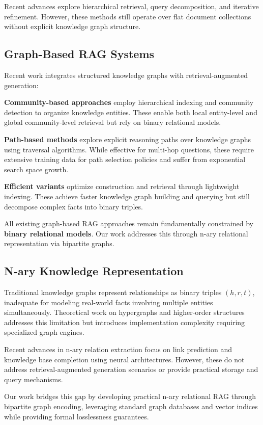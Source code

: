 \documentclass[11pt,a4paper]{article}
\begin{document}
Recent advances explore hierarchical retrieval, query decomposition, and iterative refinement. However, these methods still operate over flat document collections without explicit knowledge graph structure.

\subsection{Graph-Based RAG Systems}

Recent work integrates structured knowledge graphs with retrieval-augmented generation:

\textbf{Community-based approaches} employ hierarchical indexing and community detection to organize knowledge entities. These enable both local entity-level and global community-level retrieval but rely on binary relational models.

\textbf{Path-based methods} explore explicit reasoning paths over knowledge graphs using traversal algorithms. While effective for multi-hop questions, these require extensive training data for path selection policies and suffer from exponential search space growth.

\textbf{Efficient variants} optimize construction and retrieval through lightweight indexing. These achieve faster knowledge graph building and querying but still decompose complex facts into binary triples.

All existing graph-based RAG approaches remain fundamentally constrained by \textbf{binary relational models}. Our work addresses this through n-ary relational representation via bipartite graphs.

\subsection{N-ary Knowledge Representation}

Traditional knowledge graphs represent relationships as binary triples $(h, r, t)$, inadequate for modeling real-world facts involving multiple entities simultaneously. Theoretical work on hypergraphs and higher-order structures addresses this limitation but introduces implementation complexity requiring specialized graph engines.

Recent advances in n-ary relation extraction focus on link prediction and knowledge base completion using neural architectures. However, these do not address retrieval-augmented generation scenarios or provide practical storage and query mechanisms.

Our work bridges this gap by developing practical n-ary relational RAG through bipartite graph encoding, leveraging standard graph databases and vector indices while providing formal losslessness guarantees.
\end{document}
